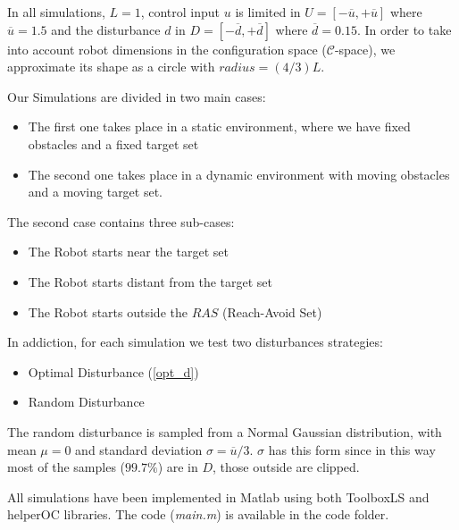 In all simulations, $L=1$, control input $u$ is limited in $U = [-\overline{u}, +\overline{u}]$ where $\overline{u}=1.5$ and the disturbance $d$ in $D=[-\overline{d}, +\overline{d}]$ where $\overline{d}=0.15$. In order to take into account robot dimensions in the configuration space ($\mathcal{C}$-space), we approximate its shape as a circle with $radius = (4/3)L$.

Our Simulations are divided in two main cases: 
\begin{itemize}
    \item The first one takes place in a static environment, where we have fixed obstacles and a fixed target set 
    \item The second one takes place in a dynamic environment with moving obstacles and a moving target set.
\end{itemize}
The second case contains three sub-cases:  
\begin{itemize}
    \item The Robot starts near the target set
    \item The Robot starts distant from the target set
    \item The Robot starts outside the $RAS$ (Reach-Avoid Set)
\end{itemize}
In addiction, for each simulation we test two disturbances strategies: 
\begin{itemize}
    \item Optimal Disturbance (\ref{opt_d})
    \item Random Disturbance 
\end{itemize}
The random disturbance is sampled from a Normal Gaussian distribution, with mean $\mu=0$ and standard deviation $\sigma=\overline{u}/3$. $\sigma$ has this form since in this way most of the samples ($99.7\%$) are in $D$, those outside are clipped.

All simulations have been implemented in Matlab using both ToolboxLS \cite{LS} and helperOC \cite{brief_intro} libraries. The code (\textit{main.m}) is available in the code folder.

